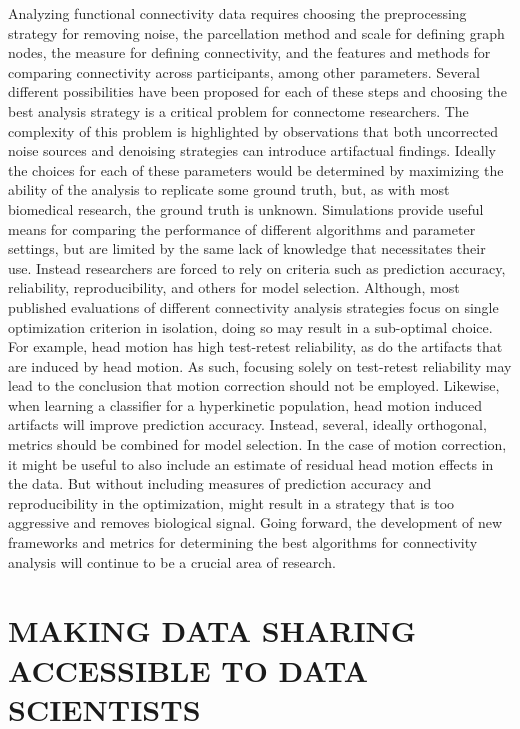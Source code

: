 Analyzing functional connectivity data requires choosing the preprocessing strategy for removing noise, the parcellation method and scale for defining graph nodes, the measure for defining connectivity, and the features and methods for comparing connectivity across participants, among other parameters. Several different possibilities have been proposed for each of these steps and choosing the best analysis strategy is a critical problem for connectome researchers. The complexity of this problem is highlighted by observations that both uncorrected noise sources and denoising strategies can introduce artifactual findings. Ideally the choices for each of these parameters would be determined by maximizing the ability of the analysis to replicate some ground truth, but, as with most biomedical research, the ground truth is unknown. Simulations provide useful means for comparing the performance of different algorithms and parameter settings, but are limited by the same lack of knowledge that necessitates their use. Instead researchers are forced to rely on criteria such as prediction accuracy, reliability, reproducibility, and others for model selection. Although, most published evaluations of different connectivity analysis strategies focus on single optimization criterion in isolation, doing so may result in a sub-optimal choice. For example, head motion has high test-retest reliability, as do the artifacts that are induced by head motion. As such, focusing solely on test-retest reliability may lead to the conclusion that motion correction should not be employed. Likewise, when learning a classifier for a hyperkinetic population, head motion induced artifacts will improve prediction accuracy. Instead, several, ideally orthogonal, metrics should be combined for model selection. In the case of motion correction, it might be useful to also include an estimate of residual head motion effects in the data. But without including measures of prediction accuracy and reproducibility in the optimization, might result in a strategy that is too aggressive and removes biological signal. Going forward, the development of new frameworks and metrics for determining the best algorithms for connectivity analysis will continue to be a crucial area of research. 

\section{MAKING DATA SHARING ACCESSIBLE TO DATA SCIENTISTS}

